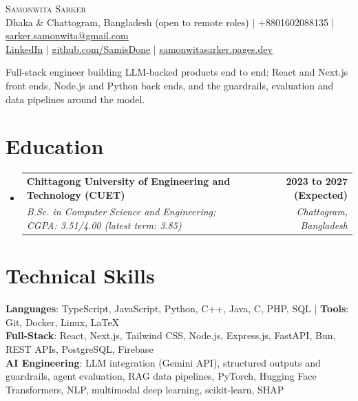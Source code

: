 \documentclass[a4paper,10pt]{article}
\makeatletter
\newcommand{\resumeSubheading}[4]{
  \vspace{1pt}\item
    \begin{tabular*}{1.0\textwidth}[t]{l@{\extracolsep{\fill}}r}
      \textbf{#1} & \textbf{\small #2} \\
      \textit{\small#3} & \textit{\small #4} \\
    \end{tabular*}\vspace{-7pt}
}
\newcommand{\resumeSubHeadingListStart}{\begin{itemize}[leftmargin=0.0in, label={}]}
\newcommand{\resumeSubHeadingListEnd}{\end{itemize}}
\newcommand{\lnk}[2]{\href{#1}{\underline{#2}}}
\makeatother
\begin{document}
\begin{center}
    {\Huge \scshape Samonwita Sarker} \\ \vspace{2pt}
    \small Dhaka \& Chattogram, Bangladesh (open to remote roles) $|$ +8801602088135 $|$
    \lnk{mailto:sarker.samonwita@gmail.com}{sarker.samonwita@gmail.com} \\ \vspace{1pt}
    \lnk{https://www.linkedin.com/in/samonwita-sarker-a87737262/}{LinkedIn} $|$
    \lnk{https://github.com/SamisDone}{github.com/SamisDone} $|$
    \lnk{https://samonwitasarker.pages.dev/}{samonwitasarker.pages.dev}
    \vspace{-6pt}
\end{center}

{\small Full-stack engineer building LLM-backed products end to end: React and Next.js front ends, Node.js and Python back ends, and the guardrails, evaluation and data pipelines around the model.}
\vspace{-6pt}

\section{Education}
  \resumeSubHeadingListStart
    \resumeSubheading
      {Chittagong University of Engineering and Technology (CUET)}{2023 to 2027 (Expected)}
      {B.Sc. in Computer Science and Engineering; CGPA: 3.51/4.00 (latest term: 3.85)}{Chattogram, Bangladesh}
  \resumeSubHeadingListEnd

\section{Technical Skills}
 \begin{itemize}[leftmargin=0.15in, label={}]
    \small{\item{
     \textbf{Languages}{: TypeScript, JavaScript, Python, C++, Java, C, PHP, SQL} $|$ \textbf{Tools}{: Git, Docker, Linux, LaTeX} \\
     \textbf{Full-Stack}{: React, Next.js, Tailwind CSS, Node.js, Express.js, FastAPI, Bun, REST APIs, PostgreSQL, Firebase} \\
     \textbf{AI Engineering}{: LLM integration (Gemini API), structured outputs and guardrails, agent evaluation, RAG data pipelines, PyTorch, Hugging Face Transformers, NLP, multimodal deep learning, scikit-learn, SHAP}
    }}
 \end{itemize}
 \vspace{-14pt}
\end{document}
